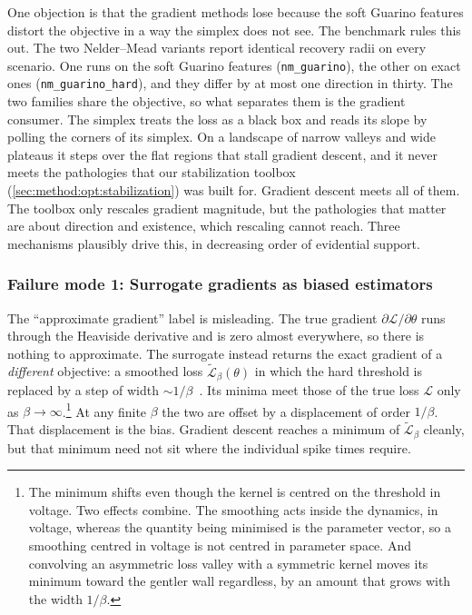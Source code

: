 One objection is that the gradient methods lose because the soft Guarino features distort the objective in a way the simplex does not see.
The benchmark rules this out.
The two Nelder--Mead variants report identical recovery radii on every scenario.
One runs on the soft Guarino features (\texttt{nm\_guarino}), the other on exact ones (\texttt{nm\_guarino\_hard}), and they differ by at most one direction in thirty.
The two families share the objective, so what separates them is the gradient consumer.
The simplex treats the loss as a black box and reads its slope by polling the corners of its simplex.
On a landscape of narrow valleys and wide plateaus it steps over the flat regions that stall gradient descent,
and it never meets the pathologies that our stabilization toolbox (\cref{sec:method:opt:stabilization}) was built for.
Gradient descent meets all of them.
The toolbox only rescales gradient magnitude, but the pathologies that matter are about direction and existence, which rescaling cannot reach.
Three mechanisms plausibly drive this, in decreasing order of evidential support.

\subsubsection{Failure mode 1: Surrogate gradients as biased estimators}\label{sec:discussion:bias}

The ``approximate gradient'' label is misleading.
The true gradient $\partial\mathcal{L}/\partial\theta$ runs through the Heaviside derivative and is zero almost everywhere, so there is nothing to approximate.
The surrogate instead returns the exact gradient of a \emph{different} objective: a smoothed loss $\widetilde{\mathcal{L}}_\beta(\theta)$ in which the hard threshold is replaced by a step of width $\sim 1/\beta$~\cite{Gygax2025}.
Its minima meet those of the true loss $\mathcal{L}$ only as $\beta\to\infty$.\footnote{The minimum shifts even though the kernel is centred on the threshold in voltage. Two effects combine. The smoothing acts inside the dynamics, in voltage, whereas the quantity being minimised is the parameter vector, so a smoothing centred in voltage is not centred in parameter space. And convolving an asymmetric loss valley with a symmetric kernel moves its minimum toward the gentler wall regardless, by an amount that grows with the width $1/\beta$.}
At any finite $\beta$ the two are offset by a displacement of order $1/\beta$.
That displacement is the bias.
Gradient descent reaches a minimum of $\widetilde{\mathcal{L}}_\beta$ cleanly, but that minimum need not sit where the individual spike times require.

